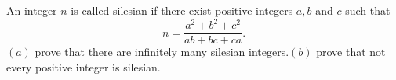 An integer $n $ is called silesian if there exist positive integers $a,b$ and $c$ such that $$n=\frac{a^2+b^2+c^2}{ab+bc+ca}.$$$(a)$ prove that there are infinitely many silesian integers.$(b)$ prove that  not every positive integer is silesian.
